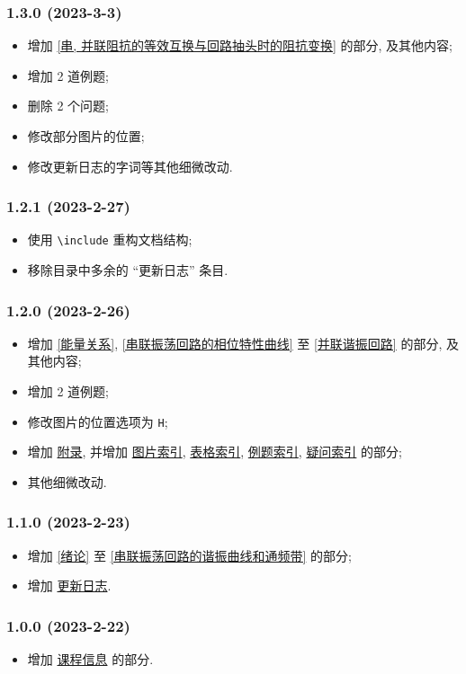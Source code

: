 \subsubsection*{1.3.0 (2023-3-3)}
\begin{itemize}
    \item 增加 \ref{串, 并联阻抗的等效互换与回路抽头时的阻抗变换} 的部分, 及其他内容;
    \item 增加 2 道例题;
    \item 删除 2 个问题;
    \item 修改部分图片的位置;
    \item 修改更新日志的字词等其他细微改动.
\end{itemize}

\subsubsection*{1.2.1 (2023-2-27)}
\begin{itemize}
    \item 使用 \texttt{\textbackslash include} 重构文档结构;
    \item 移除目录中多余的 ``更新日志'' 条目.
\end{itemize}

\subsubsection*{1.2.0 (2023-2-26)}
\begin{itemize}
    \item 增加 \ref{能量关系}, \ref{串联振荡回路的相位特性曲线} 至 \ref{并联谐振回路} 的部分, 及其他内容;
    \item 增加 2 道例题;
    \item 修改图片的位置选项为 \texttt{H};
    \item 增加 \hyperref[附录]{附录}, 并增加 \hyperref[图片索引]{图片索引}, \hyperref[表格索引]{表格索引}, \hyperref[例题索引]{例题索引}, \hyperref[疑问索引]{疑问索引} 的部分;
    \item 其他细微改动.
\end{itemize}

\subsubsection*{1.1.0 (2023-2-23)}
\begin{itemize}
    \item 增加 \ref{绪论} 至 \ref{串联振荡回路的谐振曲线和通频带} 的部分;
    \item 增加 \hyperref[更新日志]{更新日志}.
\end{itemize}

\subsubsection*{1.0.0 (2023-2-22)}
\begin{itemize}
    \item 增加 \hyperref[课程信息]{课程信息} 的部分.
\end{itemize}
